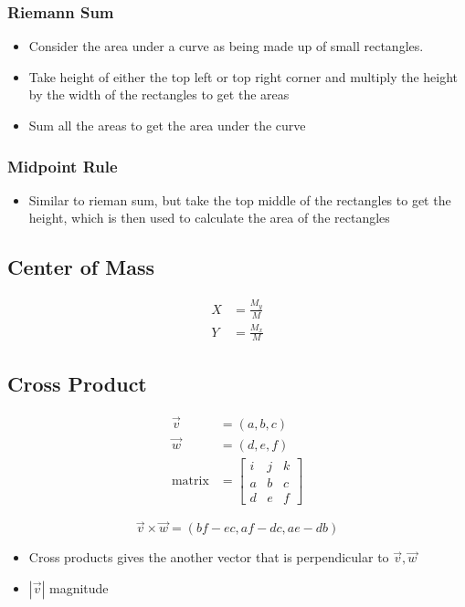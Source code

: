     \subsubsection{Riemann Sum}

      \begin{itemize}
        \item Consider the area under a curve as being made up of small rectangles.
        \item Take height of either the top left or top right corner and
        multiply the height by the width of the rectangles to get the areas
        \item Sum all the areas to get the area under the curve
      \end{itemize}

    \subsubsection{Midpoint Rule}

      \begin{itemize}
        \item Similar to rieman sum, but take the top middle of the rectangles
        to get the height, which is then used to calculate the area of the
        rectangles
      \end{itemize}

  \subsection{Center of Mass}

    \begin{align}
      X &= \frac{M_{y}}{M} \\
      Y &= \frac{M_{x}}{M}
    \end{align}

  \subsection{Cross Product}

    \begin{align*}
      \vec{v} &= \left( a, b, c \right) \\
      \vec{w} &= \left( d, e, f \right) \\
      \text{matrix} &=
      \begin{bmatrix}
        i & j & k \\
        a & b & c \\
        d & e & f
      \end{bmatrix}
    \end{align*}

    \begin{equation}
      \vec{v} \times \vec{w} = \left( bf - ec, af - dc, ae - db \right)
    \end{equation}

    \begin{itemize}
      \item Cross products gives the another vector that is perpendicular to
      $ \vec{v}, \vec{w} $
      \item $ \left| \vec{v} \right| $ magnitude
    \end{itemize}
